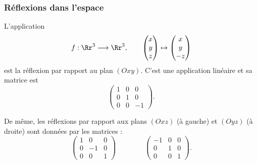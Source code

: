 \documentclass[class=report,crop=false]{standalone}
\begin{document}
\subsubsection{Réflexions dans l'espace}

L'application
$$
f: \Rr^3  \longrightarrow \Rr^3, \qquad \begin{pmatrix}x\\y\\z\end{pmatrix} \mapsto \begin{pmatrix}x\\y\\-z\end{pmatrix}$$
est la réflexion par rapport au plan $(Oxy)$. C'est une application linéaire et sa matrice est
\[ \begin{pmatrix}
1 & 0 & 0\\
0 & 1 & 0\\
0 & 0 & -1
\end{pmatrix}
. \]

De même, les réflexions par rapport aux plans $(Oxz)$ (à gauche) et $(Oyz)$ (à droite) sont données par les matrices :
$$\begin{pmatrix}
1 & 0 & 0\\
0 & -1 & 0\\
0 & 0 & 1
\end{pmatrix}
\qquad \qquad
\begin{pmatrix}
-1 & 0 & 0\\
0 & 1 & 0\\
0 & 0 & 1
\end{pmatrix}.$$



\end{document}
